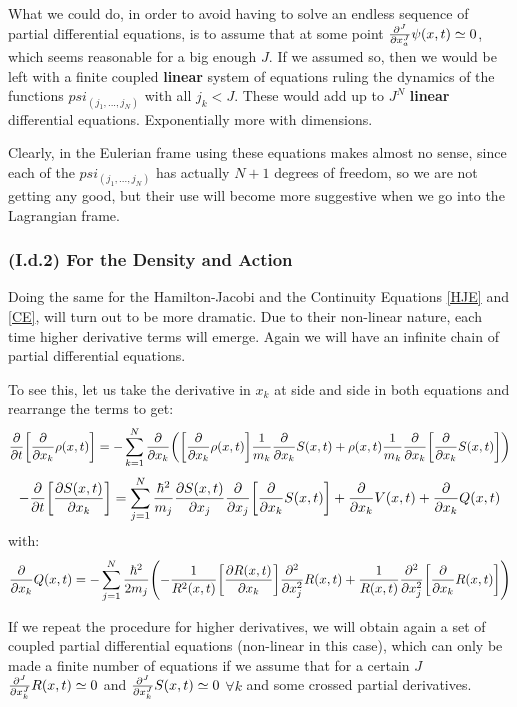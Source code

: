 \documentclass[11pt, a4paper]{article} %
\begin{document}
What we could do, in order to avoid having to solve an endless sequence of partial differential equations, is to assume that at some point $\pdv[J]{}{x_a}\psi(x,t)\simeq 0$, which seems reasonable for a big enough $J$. If we assumed so, then we would be left with a finite coupled {\bf linear} system of equations ruling the dynamics of the functions $psi_{(j_1,...,j_N)}$ with all $j_k<J$. These would add up to $J^N$ {\bf linear} differential equations. Exponentially more with dimensions.

Clearly, in the Eulerian frame using these equations makes almost no sense, since each of the $psi_{(j_1,...,j_N)}$ has actually $N+1$ degrees of freedom, so we are not getting any good, but their use will become more suggestive when we go into the Lagrangian frame.

\subsubsection*{(I.d.2) For the Density and Action}

Doing the same for the Hamilton-Jacobi and the Continuity Equations \eqref{HJE} and \eqref{CE}, will turn out to be more dramatic. Due to their non-linear nature, each time higher derivative terms will emerge. Again we will have an infinite chain of partial differential equations.

To see this, let us take the derivative in $x_k$ at side and side in both equations and rearrange the terms to get:
\begin{equation}
\pdv{}{t} \qty[\pdv{}{x_k}\rho(x,t)]=-\sum_{k=1}^N \pdv{}{x_k}\qty( \qty[ \pdv{}{x_k}\rho(x,t)]\frac{1}{m_k}\pdv{}{x_k} S(x,t)+\rho(x,t)\frac{1}{m_k}\pdv{}{x_k} \qty[\pdv{}{x_k}S(x,t)] )
\end{equation}
\begin{equation}
-\pdv{}{t}\qty[\pdv{S(x,t)}{x_k}] = \sum_{j=1}^N \frac{\hbar^2}{m_j}\pdv{S(x,t)}{x_j} \pdv{}{x_j}\qty[\pdv{}{x_k} S(x,t) ]+ \pdv{}{x_k}V(x,t)+\pdv{}{x_k}Q(x,t)
\end{equation}
with:
\begin{equation}
\pdv{}{x_k}Q(x,t)=-\sum_{j=1}^N \frac{\hbar^2}{2m_j}\qty( -\frac{1}{R^2(x,t)}\qty[\pdv{R(x,t)}{x_k}]\pdv[2]{}{x_j} R(x,t)+\frac{1}{R(x,t)}\pdv[2]{}{x_j} \qty[\pdv{}{x_k}R(x,t)])
\end{equation}

If we repeat the procedure for higher derivatives, we will obtain again a set of coupled partial differential equations (non-linear in this case), which can only be made a finite number of equations if we assume that for a certain $J$ $\pdv[J]{}{x_k}R(x,t)\simeq 0$ and $\pdv[J]{}{x_k}S(x,t)\simeq 0$ $\forall k$ and some crossed partial derivatives.
\end{document}
